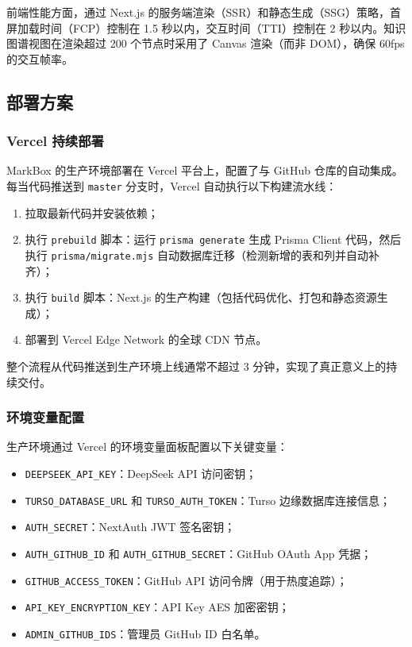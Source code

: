 \documentclass[12pt,a4paper]{ctexart}
\begin{document}
前端性能方面，通过 Next.js 的服务端渲染（SSR）和静态生成（SSG）策略，首屏加载时间（FCP）控制在 1.5 秒以内，交互时间（TTI）控制在 2 秒以内。知识图谱视图在渲染超过 200 个节点时采用了 Canvas 渲染（而非 DOM），确保 60fps 的交互帧率。

\subsection{部署方案}

\subsubsection{Vercel 持续部署}

MarkBox 的生产环境部署在 Vercel 平台上，配置了与 GitHub 仓库的自动集成。每当代码推送到 \texttt{master} 分支时，Vercel 自动执行以下构建流水线：

\begin{enumerate}
  \item 拉取最新代码并安装依赖；
  \item 执行 \texttt{prebuild} 脚本：运行 \texttt{prisma generate} 生成 Prisma Client 代码，然后执行 \texttt{prisma/migrate.mjs} 自动数据库迁移（检测新增的表和列并自动补齐）；
  \item 执行 \texttt{build} 脚本：Next.js 的生产构建（包括代码优化、打包和静态资源生成）；
  \item 部署到 Vercel Edge Network 的全球 CDN 节点。
\end{enumerate}

整个流程从代码推送到生产环境上线通常不超过 3 分钟，实现了真正意义上的持续交付\cite{ref:vercel}。

\subsubsection{环境变量配置}

生产环境通过 Vercel 的环境变量面板配置以下关键变量：

\begin{itemize}
  \item \texttt{DEEPSEEK\_API\_KEY}：DeepSeek API 访问密钥；
  \item \texttt{TURSO\_DATABASE\_URL} 和 \texttt{TURSO\_AUTH\_TOKEN}：Turso 边缘数据库连接信息；
  \item \texttt{AUTH\_SECRET}：NextAuth JWT 签名密钥；
  \item \texttt{AUTH\_GITHUB\_ID} 和 \texttt{AUTH\_GITHUB\_SECRET}：GitHub OAuth App 凭据；
  \item \texttt{GITHUB\_ACCESS\_TOKEN}：GitHub API 访问令牌（用于热度追踪）；
  \item \texttt{API\_KEY\_ENCRYPTION\_KEY}：API Key AES 加密密钥；
  \item \texttt{ADMIN\_GITHUB\_IDS}：管理员 GitHub ID 白名单。
\end{itemize}
\end{document}

